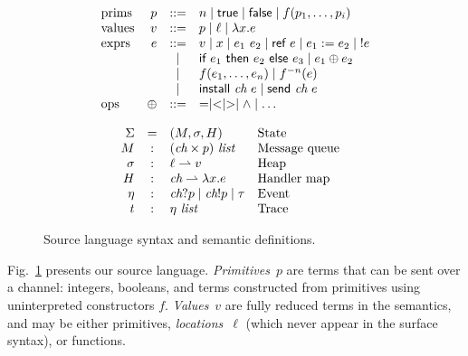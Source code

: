 \documentclass[10pt,conference,compsocconf]{IEEEtran}
\newcommand{\sfmt}[1]{\textsf{#1}}
\newcommand{\sch}{\textit{ch}}
\newcommand{\loc}{\ell}
\newcommand{\sassign}[2]{#1 := #2}
\newcommand{\sderef}[1]{!#1}
\newcommand{\sfalse}{\sfmt{false}}
\newcommand{\sif}[3]{\sfmt{if}~#1~\sfmt{then}~#2~\sfmt{else}~#3}
\newcommand{\sinstall}[2]{\sfmt{install}~#1~#2}
\newcommand{\sref}[1]{\sfmt{ref}~#1}
\newcommand{\ssend}[2]{\sfmt{send}~#1~#2}
\newcommand{\strue}{\sfmt{true}}
\newcommand{\partialfun}{\rightharpoonup}
\newcommand{\xv}{p}
\newcommand{\evt}{\eta}
\begin{document}
\begin{figure}[t!]
  \begin{displaymath}
    \begin{array}{lrcl}
      \hbox{prims} & \xv & ::= & n \mid \strue \mid \sfalse \mid f(\xv_1, \ldots, \xv_i) \\
      \hbox{values} & v & ::= & p \mid \loc \mid \lambda x.e \\
      \hbox{exprs} & e & ::= &
      v
      \mid x
      \mid e_1~e_2
      \mid  \sref{e}
      \mid \sassign{e_1}{e_2}
      \mid \;\sderef{e} \\
      && \mid & \sif{e_1}{e_2}{e_3}
      \mid e_1 \oplus e_2 \\
      && \mid & f(e_1, \ldots, e_n)
      \mid f^{-n}(e) \\
      && \mid & \sinstall{\sch}{e}
      \mid \ssend{\sch}{e} \\
      \hbox{ops} & \oplus & ::= &  = \mid < \mid > \mid \wedge \mid \ldots \\
    \end{array}
  \end{displaymath}    

    
  \begin{displaymath}
    \begin{array}{rclp{1in}}
      \Sigma & = & (M, \sigma, H) & State \\
        M & : & (\sch \times p) ~ \textit{list} & Message queue \\
      \sigma & : & \loc \partialfun  v & Heap \\
      H & : & \sch \partialfun \lambda x.e & Handler map \\
      \evt & : & \sch ? p \mid \sch ! p \mid \tau & Event \\
      t & : & \evt ~ \textit{list} & Trace \\
    \end{array}
  \end{displaymath}
  \caption{Source language syntax and semantic definitions.}
  \label{fig:lang}
\end{figure}

Fig.~\ref{fig:lang} presents our source language.
\emph{Primitives}~$p$ are terms that can be sent over a channel:
integers, booleans, and terms constructed from primitives using
uninterpreted constructors $f$.  \emph{Values}~$v$ are fully reduced terms in
the semantics, and may be either primitives, \emph{locations}~$\loc$
(which never appear in the surface syntax), or functions.
\end{document}
